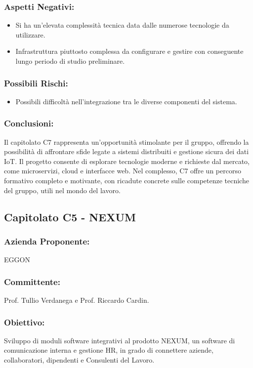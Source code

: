 \documentclass[a4paper,12pt]{article}
\begin{document}
\subsubsection*{Aspetti Negativi:}
\begin{itemize}
    \item Si ha un'elevata complessità tecnica data dalle numerose tecnologie da utilizzare.
    \item Infrastruttura piuttosto complessa da configurare e gestire con conseguente lungo periodo di studio preliminare.
\end{itemize}

\subsubsection*{Possibili Rischi:}
\begin{itemize}
    \item Possibili difficoltà nell'integrazione tra le diverse componenti del sistema.
\end{itemize}

\subsubsection*{Conclusioni:}
Il capitolato C7 rappresenta un’opportunità stimolante per il gruppo, offrendo la possibilità di affrontare sfide legate a sistemi distribuiti e gestione sicura dei dati IoT.
Il progetto consente di esplorare tecnologie moderne e richieste dal mercato, come microservizi, cloud e interfacce web. Nel complesso, C7 offre un percorso formativo completo e motivante, con ricadute concrete sulle competenze tecniche del gruppo, utili nel mondo del lavoro.

\subsection{ Capitolato C5 - NEXUM}
\subsubsection*{Azienda Proponente:} EGGON
\subsubsection*{Committente:} Prof. Tullio Verdanega e Prof. Riccardo Cardin.
\subsubsection*{Obiettivo:}
Sviluppo di moduli software integrativi al prodotto NEXUM, un software di comunicazione interna e gestione HR, in grado di connettere aziende, collaboratori, dipendenti e Consulenti del Lavoro.
\end{document}

